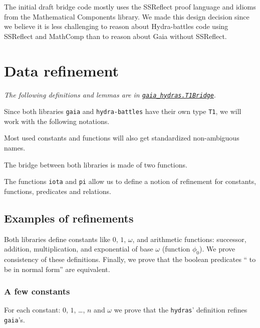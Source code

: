 The initial draft bridge code mostly uses the SSReflect proof language and idioms from the Mathematical Components library. We made this design decision since we believe it is less challenging to reason about Hydra-battles code using SSReflect and MathComp than to reason about Gaia without SSReflect.

\section{Data refinement}

\emph{The following definitions and lemmas are in
\href{../theories/html/gaia_hydras.T1Bridge.html}%
{\texttt{gaia\_hydras.T1Bridge}}}.

Since both libraries \texttt{gaia} and \texttt{hydra-battles} have their own type \texttt{T1}, we will work with the following notations.


Most used constants and functions will also get standardized
non-ambiguous names.





The bridge between both libraries is made of two functions.



The functions \texttt{iota} and \texttt{pi} allow us to define
a notion of refinement for constants, functions, predicates and relations.


\subsection{Examples of refinements}
Both libraries define constants like $0$, $1$, $\omega$, and arithmetic functions: successor, addition, multiplication, and exponential of base $\omega$ (function $\phi_0$). We prove consistency of these definitions. Finally, we prove that the boolean predicates `` to be in normal form'' are equivalent.

\subsubsection{A few constants}
For each constant: $0$, $1$, \dots, $n$ and $\omega$ we prove
that the \texttt{hydras}' definition refines \texttt{gaia}'s.

